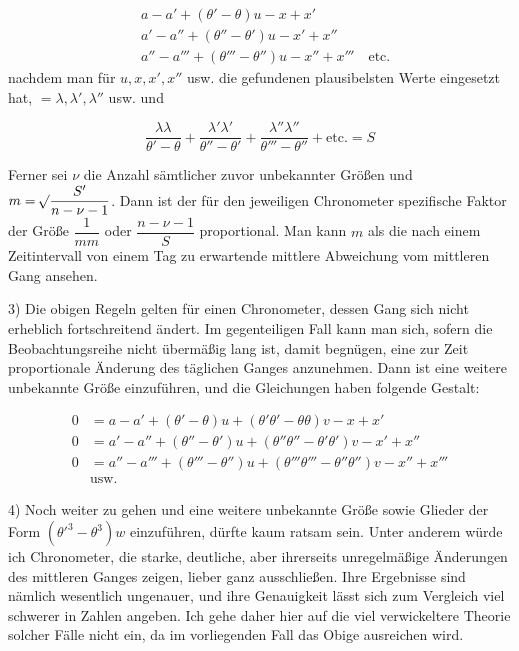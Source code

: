 \[
\begin{aligned}
&a-a'+(\theta'-\theta)u-x+x'\\
&a'-a''+(\theta''-\theta')u-x'+x''\\
&a''-a'''+(\theta'''-\theta'')u-x''+x''' \quad \text{etc.}
\end{aligned}
\]
\noindent nachdem man für $u, x, x', x''$ usw. die gefundenen plausibelsten Werte eingesetzt hat, $=\lambda, \lambda', \lambda''$ usw. und

\[
\frac{\lambda\lambda}{\theta'-\theta} + \frac{\lambda'\lambda'}{\theta''-\theta'} + \frac{\lambda''\lambda''}{\theta'''-\theta''} + \text{etc.} = S
\]

Ferner sei $\nu$ die Anzahl sämtlicher zuvor unbekannter Größen und $m=\mathord{{}^{}\!\surd}\dfrac{S'}{n-\nu-1}$. Dann ist der für den jeweiligen Chronometer spezifische Faktor der Größe $\dfrac{1}{mm}$ oder $\dfrac{n-\nu-1}{S}$ proportional. Man kann $m$ als die nach einem Zeitintervall von einem Tag zu erwartende mittlere Abweichung vom mittleren Gang ansehen.

3) Die obigen Regeln gelten für einen Chronometer, dessen Gang sich nicht erheblich fortschreitend ändert. Im gegenteiligen Fall kann man sich, sofern die Beobachtungsreihe nicht übermäßig lang ist, damit begnügen, eine zur Zeit proportionale Änderung des täglichen Ganges anzunehmen. Dann ist eine weitere unbekannte Größe einzuführen, und die Gleichungen haben folgende Gestalt:

\[
\begin{aligned}
0 &= a-a'+(\theta'-\theta)u+(\theta'\theta'-\theta\theta)v-x+x'\\
0 &= a'-a''+(\theta''-\theta')u+(\theta''\theta''-\theta'\theta')v-x'+x''\\
0 &= a''-a'''+(\theta'''-\theta'')u+(\theta'''\theta'''-\theta''\theta'')v-x''+x'''\\
&\text{usw.}
\end{aligned}
\]

4) Noch weiter zu gehen und eine weitere unbekannte Größe sowie Glieder der Form $(\theta'^3-\theta^3)w$ einzuführen, dürfte kaum ratsam sein. Unter anderem würde ich Chronometer, die starke, deutliche, aber ihrerseits unregelmäßige Änderungen des mittleren Ganges zeigen, lieber ganz ausschließen. Ihre Ergebnisse sind nämlich wesentlich ungenauer, und ihre Genauigkeit lässt sich zum Vergleich viel schwerer in Zahlen angeben. Ich gehe daher hier auf die viel verwickeltere Theorie solcher Fälle nicht ein, da im vorliegenden Fall das Obige ausreichen wird.

